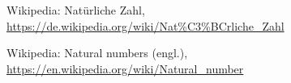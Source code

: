 \documentclass[10pt, a4paper, twocolumn]{article} %
\begin{document}

\begin{thebibliography}{9}
	Wikipedia: Natürliche Zahl,
	\url{https://de.wikipedia.org/wiki/Nat\%C3\%BCrliche_Zahl}

    Wikipedia: Natural numbers (engl.),
    \url{https://en.wikipedia.org/wiki/Natural_number}


\end{thebibliography}
\end{document}
